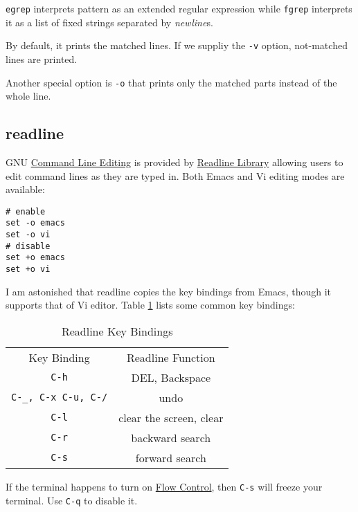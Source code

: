 \lstinline|egrep| interprets pattern as an extended regular
expression while \lstinline|fgrep| interprets it as a list of
fixed strings separated by \textit{newline}s.

By default, it prints the matched lines. If we suppliy the
\lstinline|-v| option, not-matched lines are printed.

Another special option is \lstinline|-o| that prints only the
matched parts instead of the whole line.

\subsection{readline}
\label{sec:gnu-readline}

GNU
\href{https://www.gnu.org/software/bash/manual/bash.html#Command-Line-Editing}{Command
  Line Editing} is provided by
\href{https://tiswww.case.edu/php/chet/readline/rltop.html}{Readline
  Library} allowing users to edit command lines as they are typed
in. Both Emacs and Vi editing modes are available:

\begin{minipage}{1.0\linewidth}
\begin{lstlisting}
# enable
set -o emacs
set -o vi
# disable
set +o emacs
set +o vi
\end{lstlisting}
\end{minipage}

I am astonished that readline copies the key bindings from Emacs,
though it supports that of Vi editor. Table
\ref{tab:readline-bindings} lists some common key bindings:

\begin{table}[tbp]
  \centering
  \begin{tabular}{c|c}
    \hline{}
    Key Binding & Readline Function \\
    \verb|C-h| & DEL, Backspace \\
    \verb|C-_, C-x C-u, C-/| & undo \\
    \verb|C-l| & clear the screen, clear \\
    \verb|C-r| & backward search \\
    \verb|C-s| & forward search
  \end{tabular}
  \caption{Readline Key Bindings}
  \label{tab:readline-bindings}
\end{table}

If the terminal happens to turn on
\href{https://www.tldp.org/HOWTO/Text-Terminal-HOWTO-11.html}{Flow
  Control}, then \verb|C-s| will freeze your terminal. Use
\verb|C-q| to disable it.

